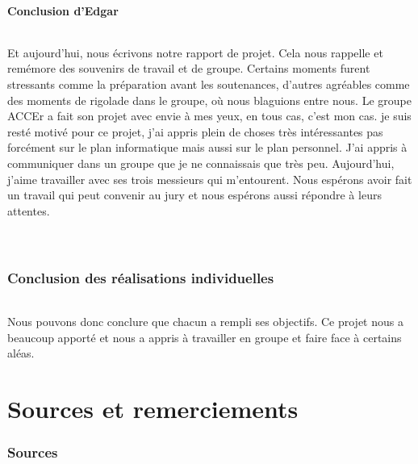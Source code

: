 \documentclass[titlepage, 13px, a4paper]{report}
\begin{document}
\subsection{Conclusion d'Edgar}
\paragraph{} \hspace{0pt}
Et aujourd’hui, nous écrivons notre rapport de projet. Cela nous rappelle et remémore des souvenirs de travail et 
de groupe. Certains moments furent stressants comme la préparation avant les soutenances, 
d’autres agréables comme des moments de rigolade dans le groupe, où nous blaguions entre nous. Le groupe 
ACCEr a fait son projet avec envie à mes yeux, en tous cas, c’est mon cas. je suis resté motivé pour ce projet, 
j’ai appris plein de choses très intéressantes pas forcément sur le plan informatique mais aussi sur le plan 
personnel. J’ai appris à communiquer dans un groupe que je ne connaissais que très peu. Aujourd’hui, j’aime 
travailler avec ses trois messieurs qui m’entourent. Nous espérons avoir fait un travail qui peut convenir 
au jury et nous espérons aussi répondre à leurs attentes. \\ \\ \\

\section*{Conclusion des réalisations individuelles}
\paragraph{} \hspace{0pt}
Nous pouvons donc conclure que chacun a rempli ses objectifs.
Ce projet nous a beaucoup apporté et nous a appris à travailler en groupe et faire face à certains aléas.



\newpage


\part{Sources et remerciements}

\section{Sources}
\end{document}
